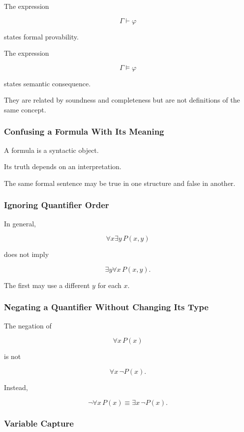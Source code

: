The expression

\[
\Gamma\vdash\varphi
\]

states formal provability.

The expression

\[
\Gamma\models\varphi
\]

states semantic consequence.

They are related by soundness and completeness but are not definitions of
the same concept.

\subsubsection{Confusing a Formula With Its Meaning}

A formula is a syntactic object.

Its truth depends on an interpretation.

The same formal sentence may be true in one structure and false in
another.

\subsubsection{Ignoring Quantifier Order}

In general,

\[
\boxed{
\forall x\exists y\,P(x,y)
}
\]

does not imply

\[
\boxed{
\exists y\forall x\,P(x,y).
}
\]

The first may use a different \(y\) for each \(x\).

\subsubsection{Negating a Quantifier Without Changing Its Type}

The negation of

\[
\forall x\,P(x)
\]

is not

\[
\forall x\,\neg P(x).
\]

Instead,

\[
\boxed{
\neg\forall x\,P(x)
\equiv
\exists x\,\neg P(x).
}
\]

\subsubsection{Variable Capture}

